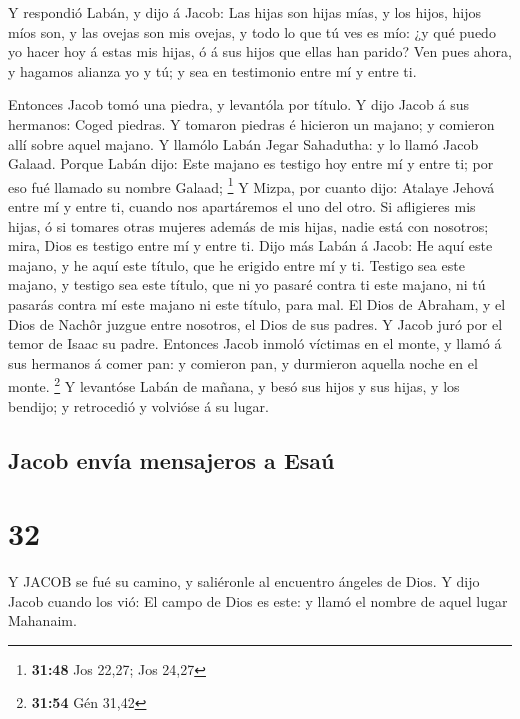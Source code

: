  Y respondió Labán, y dijo á Jacob: Las hijas son hijas
mías, y los hijos, hijos míos son, y las ovejas son mis ovejas, y todo
lo que tú ves es mío: ¿y qué puedo yo hacer hoy á estas mis hijas, ó á
sus hijos que ellas han parido?  Ven pues ahora, y hagamos
alianza yo y tú; y sea en testimonio entre mí y entre ti.

 Entonces Jacob tomó una piedra, y levantóla por título.
 Y dijo Jacob á sus hermanos: Coged piedras. Y tomaron
piedras é hicieron un majano; y comieron allí sobre aquel majano.
 Y llamólo Labán Jegar Sahadutha: y lo llamó Jacob Galaad.
 Porque Labán dijo: Este majano es testigo hoy entre mí y
entre ti; por eso fué llamado su nombre Galaad; \footnote{\textbf{31:48}
  Jos 22,27; Jos 24,27}  Y Mizpa, por cuanto dijo: Atalaye
Jehová entre mí y entre ti, cuando nos apartáremos el uno del otro.
 Si afligieres mis hijas, ó si tomares otras mujeres además
de mis hijas, nadie está con nosotros; mira, Dios es testigo entre mí y
entre ti.  Dijo más Labán á Jacob: He aquí este majano, y
he aquí este título, que he erigido entre mí y ti.  Testigo
sea este majano, y testigo sea este título, que ni yo pasaré contra ti
este majano, ni tú pasarás contra mí este majano ni este título, para
mal.  El Dios de Abraham, y el Dios de Nachôr juzgue entre
nosotros, el Dios de sus padres. Y Jacob juró por el temor de Isaac su
padre.  Entonces Jacob inmoló víctimas en el monte, y llamó
á sus hermanos á comer pan: y comieron pan, y durmieron aquella noche en
el monte. \footnote{\textbf{31:54} Gén 31,42}  Y levantóse
Labán de mañana, y besó sus hijos y sus hijas, y los bendijo; y
retrocedió y volvióse á su lugar.

\hypertarget{jacob-envuxeda-mensajeros-a-esauxfa}{%
\subsection{Jacob envía mensajeros a
Esaú}\label{jacob-envuxeda-mensajeros-a-esauxfa}}

\hypertarget{section-31}{%
\section{32}\label{section-31}}

 Y JACOB se fué su camino, y saliéronle al encuentro ángeles
de Dios.  Y dijo Jacob cuando los vió: El campo de Dios es
este: y llamó el nombre de aquel lugar Mahanaim.

